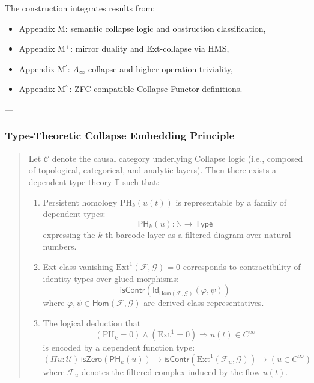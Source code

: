 \documentclass[11pt]{article}
\begin{document}
\begin{axiom}
\begin{axiom}
{{The construction integrates results from:
\begin{itemize}
  \item Appendix M: semantic collapse logic and obstruction classification,
  \item Appendix M$^+$: mirror duality and Ext-collapse via HMS,
  \item Appendix M$^\prime$: $A_\infty$-collapse and higher operation triviality,
  \item Appendix M$^{\prime\prime}$: ZFC-compatible Collapse Functor definitions.
\end{itemize}

---

\subsubsection*{Type-Theoretic Collapse Embedding Principle}

\begin{quote}
Let \( \mathcal{C} \) denote the causal category underlying Collapse logic  
(i.e., composed of topological, categorical, and analytic layers).  
Then there exists a dependent type theory \( \mathbb{T} \) such that:
\begin{enumerate}
  \item Persistent homology \( \mathrm{PH}_k(u(t)) \) is representable by a family of dependent types:  
  \[
  \mathsf{PH}_k(u) : \mathbb{N} \to \mathsf{Type}
  \]
  expressing the \(k\)-th barcode layer as a filtered diagram over natural numbers.

  \item Ext-class vanishing \( \mathrm{Ext}^1(\mathcal{F}, \mathcal{G}) = 0 \) corresponds to contractibility of identity types over glued morphisms:  
  \[
  \mathsf{isContr}\left( \mathsf{Id}_{\mathsf{Hom}(\mathcal{F}, \mathcal{G})}(\varphi, \psi) \right)
  \]
  where \( \varphi, \psi \in \mathsf{Hom}(\mathcal{F}, \mathcal{G}) \) are derived class representatives.

  \item The logical deduction that  
  \[
  (\mathrm{PH}_k = 0) \wedge (\mathrm{Ext}^1 = 0) \Rightarrow u(t) \in C^\infty
  \]
  is encoded by a dependent function type:
  \[
  (\Pi u : \mathcal{U})\, \mathsf{isZero}(\mathsf{PH}_k(u)) \to \mathsf{isContr}(\mathrm{Ext}^1(\mathcal{F}_u, \mathcal{G})) \to (u \in C^\infty)
  \]
  where \( \mathcal{F}_u \) denotes the filtered complex induced by the flow \( u(t) \).
\end{enumerate}
\end{quote}

}}
\end{axiom}
\end{axiom}
\end{document}
